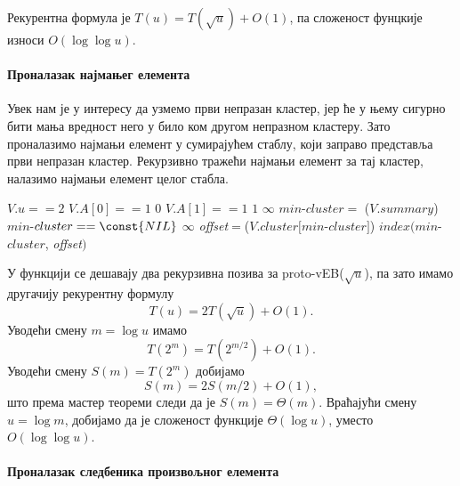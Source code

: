 \documentclass[11pt, a4paper]{article}
\theoremstyle{remark}
\numberwithin{equation}{section}
\begin{document}
	\noindent Рекурентна формула је $T(u)=T(\sqrt u)+O(1)$, па сложеност фунцкије  износи $O(\log\log u)$.
	
	\newpage
	
	\paragraph{Проналазак најмањег елемента}
	Увек нам је у интересу да узмемо први непразан кластер, јер ће у њему сигурно бити мања вредност него у било ком другом непразном кластеру. Зато проналазимо најмањи елемент у сумирајућем стаблу, који заправо представља први непразан кластер. Рекурзивно тражећи најмањи елемент за тај кластер, налазимо најмањи елемент целог стабла.
	\begin{codebox}
		\li \If $V.u==2$
		\li \Do \If $V.A[0]==1$
		\li \Do \Return $0$
		\End
		\li \If $V.A[1]==1$
		\li \Do \Return $1$
		\End
		\li \Return $\infty$
		\End
		\li \Else $min$-$cluster=$ ($V.summary$)
		\li \Do \If $min$-$cluster==\const{NIL}$
		\li \Do \Return $\infty$
		\End
		\li \Else \textit{offset}$=$($V.cluster[min$-$cluster]$)
		\li \Return $index(min$-$cluster$, \textit{offset}$)$
	\end{codebox}

	\noindent У функцији  се дешавају два рекурзивна позива за proto-vEB($\sqrt u$), па зато имамо другачију рекурентну формулу	
	\begin{equation}
	T(u)=2T(\sqrt u)+O(1).
	\end{equation}
	\noindent Уводећи смену $m=\log u$ имамо
	\begin{equation}
		T(2^m)=T(2^{m/2})+O(1).
	\end{equation}
	Уводећи смену $S(m)=T(2^m)$ добијамо
	\begin{equation}
		S(m)=2S(m/2)+O(1),
	\end{equation}
	што према мастер теореми следи да је $S(m)=\Theta (m)$. Враћајући смену $u=\log m$, добијамо да је сложеност функције  $\Theta(\log u)$, уместо $O(\log\log u)$. 
	
	\paragraph{Проналазак следбеника произвољног елемента}
	
\end{document}

